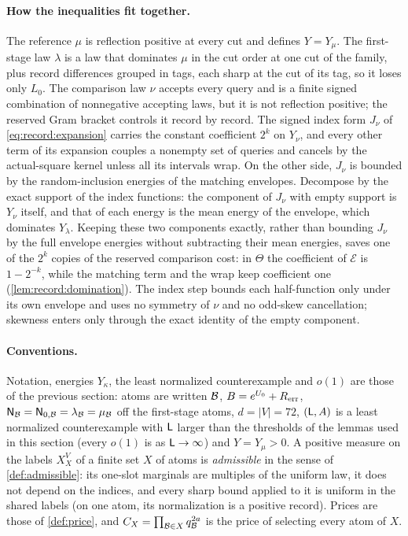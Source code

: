 \paragraph{How the inequalities fit together.}
The reference $\mu$ is reflection positive at every cut and defines
$Y=Y_\mu$. The first-stage law $\lambda$ is a law that dominates $\mu$ in the
cut order at one cut of the family, plus record differences grouped in tags,
each sharp at the cut of its tag, so it loses only $L_0$. The comparison law
$\nu$ accepts every query and is a finite signed combination of nonnegative
accepting laws, but it is not reflection positive; the reserved Gram bracket
controls it record by record. The signed index form $J_\nu$ of
\eqref{eq:record:expansion} carries the constant coefficient $2^k$ on
$Y_\nu$, and every other term of its expansion couples a nonempty set of
queries and cancels by the actual-square kernel unless all its intervals
wrap. On the other side, $J_\nu$ is bounded by the random-inclusion energies
of the matching envelopes. Decompose by the exact support of the index
functions: the component of $J_\nu$ with empty support is $Y_\nu$ itself,
and that of each energy is the mean energy of the envelope, which dominates
$Y_\lambda$. Keeping these two components exactly, rather than bounding
$J_\nu$ by the full envelope energies without subtracting their mean
energies, saves one of the $2^k$ copies of the reserved
comparison cost: in $\Theta$ the coefficient of $\mathcal E$ is $1-2^{-k}$,
while the matching term and the wrap keep coefficient one
(\cref{lem:record:domination}). The index step bounds each half-function
only under its own envelope and uses no symmetry of $\nu$ and no odd-skew
cancellation; skewness enters only through the exact identity of the empty
component.

\paragraph{Conventions.}
Notation, energies $Y_\kappa$, the least normalized counterexample and $o(1)$
are those of the previous section: atoms are written $\mathcal B$,
$B=e^{U_0}+R_{\rm err}$, $\mathsf N_\mathcal B=\mathsf N_{0,\mathcal B}=\lambda_\mathcal B=\mu_\mathcal B$ off the
first-stage atoms, $d=|V|=72$, $(\mathsf L,A)$ is a least normalized
counterexample with $\mathsf L$ larger than the thresholds of the
lemmas used in this section (every $o(1)$ is as $\mathsf L\to\infty$)
and $Y=Y_\mu>0$. A positive measure on the
labels $X_X^V$ of a finite set $X$ of atoms is \emph{admissible} in the sense
of \cref{def:admissible}: its one-slot marginals are multiples of the uniform
law, it does not depend on the indices, and every sharp bound applied to it
is uniform in the shared labels (on one atom, its normalization is a positive
record). Prices are those of \cref{def:price},
and $C_X=\prod_{\mathcal B\in X}q_\mathcal B^{2a}$ is the price of selecting every atom of
$X$.

